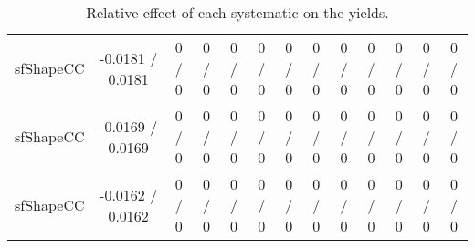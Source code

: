 \documentclass[10pt]{article}
\begin{document}
\begin{table}[htbp]
\begin{center}
\begin{tabular}{|c|c|c|c|c|c|c|c|c|c|c|c|c|}
  sfShapeCC & -0.0181 / 0.0181 & 0 / 0 & 0 / 0 & 0 / 0 & 0 / 0 & 0 / 0 & 0 / 0 & 0 / 0 & 0 / 0 & 0 / 0 & 0 / 0 & 0 / 0 \\ 
  sfShapeCC & -0.0169 / 0.0169 & 0 / 0 & 0 / 0 & 0 / 0 & 0 / 0 & 0 / 0 & 0 / 0 & 0 / 0 & 0 / 0 & 0 / 0 & 0 / 0 & 0 / 0 \\ 
  sfShapeCC & -0.0162 / 0.0162 & 0 / 0 & 0 / 0 & 0 / 0 & 0 / 0 & 0 / 0 & 0 / 0 & 0 / 0 & 0 / 0 & 0 / 0 & 0 / 0 & 0 / 0 \\ 
\hline 
\end{tabular} 
\caption{Relative effect of each systematic on the yields.} 
\end{center} 
\end{table} 
\end{document}
